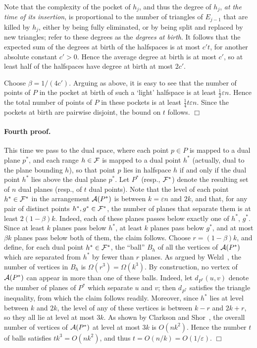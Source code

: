 \documentclass[12pt]{article}
\newcommand{\eps}{{\varepsilon}}
\def\A{{\cal A}}
\def\F{{\cal F}}
\begin{document}
Note that the complexity of the pocket of $h_j$, and thus the degree
of $h_j$, {\em at the time of its insertion}, is proportional to the
number of triangles of $E_{j-1}$ that are killed by $h_j$, either by
being fully eliminated, or by being split and replaced by new
triangles; refer to these degrees as the {\em degrees at birth}.
It follows that the expected sum of the degrees at birth of the
halfspaces is at most $c't$, for another absolute constant $c'>0$.
Hence the average degree at birth is at most $c'$, so at least
half of the halfspaces have degree at birth at most $2c'$.

Choose $\beta=1/(4c')$. Arguing as above, it is easy to see that the
number of points of $P$ in the pocket at birth
of such a `light' halfspace is
at least $\frac12\eps n$. Hence the total number of points of $P$ in
these pockets is at least $\frac14 t\eps n$. Since the pockets at
birth are pairwise disjoint, the bound on $t$ follows.
$\Box$

\paragraph{Fourth proof.}
This time we pass to the dual space, where each point $p\in P$ is
mapped to a dual plane $p^*$, and each range $h\in \F$ is mapped to a
dual point $h^*$ (actually, dual to the plane bounding $h$),
so that point $p$ lies in halfspace $h$ if and only
if the dual point $h^*$ lies above the dual plane $p^*$.  Let $P^*$
(resp., $\F^*$) denote the resulting set of $n$ dual planes (resp., of
$t$ dual points).  Note that the level of each point $h^*\in\F^*$ in
the arrangement $\A(P^*)$ is between $k=\eps n$ and $2k$, and that,
for any pair of distinct points $h^*, g^*\in\F^*$, the number of
planes that separate them is at least $2(1-\beta)k$.  Indeed, each of
these planes passes below exactly one of $h^*$, $g^*$.  Since at least
$k$ planes pass below $h^*$, at least $k$ planes pass below $g^*$, and
at most $\beta k$ planes pass below both of them, the claim follows.
Choose $r=(1-\beta)k$, and define, for each dual point $h^*\in\F^*$,
the ``ball'' $B_h$ of all the vertices of $\A(P^*)$ which are
separated from $h^*$ by fewer than $r$ planes.  As argued by
Welzl~\cite{w-stlcn-92}, the number of vertices in $B_h$ is
$\Omega(r^3)=\Omega(k^3)$. By construction, no vertex of $\A(P^*)$ can
appear in more than one of these balls. Indeed, let $d_{P^*}(u,v)$
denote the number of planes of $P^*$ which separate $u$ and $v$; then
$d_{P^*}$ satisfies the triangle inequality, from which the claim
follows readily. Moreover, since $h^*$ lies at level between $k$ and
$2k$, the level of any of these vertices is between $k-r$ and $2k+r$,
so they all lie at level at most $3k$.  As shown by Clarkson and
Shor~\cite{cs-arscg-89}, the overall number of vertices of $\A(P^*)$
at level at most $3k$ is $O(nk^2)$.  Hence the number $t$ of balls
satisfies $tk^3=O(nk^2)$, and thus $t=O(n/k)=O(1/\eps)$.  $\Box$
\end{document}
